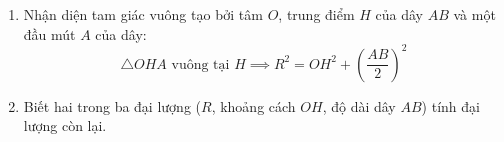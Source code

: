 \begin{enumerate}
\item Nhận diện tam giác vuông tạo bởi tâm $O$, trung điểm $H$ của dây $AB$ và một đầu mút $A$ của dây:
$$\triangle OHA\text{ vuông tại } H \implies \boxed{R^2 = OH^2 + \left(\dfrac{AB}{2}\right)^2}$$
\item Biết hai trong ba đại lượng ($R$, khoảng cách $OH$, độ dài dây $AB$) tính đại lượng còn lại.
\end{enumerate}
